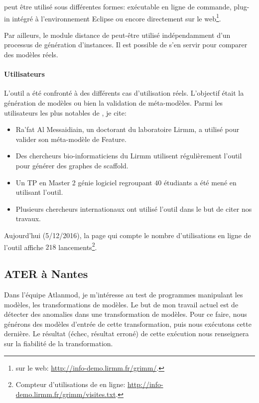 \grimm{} peut être utilisé sous différentes formes: exécutable en ligne de commande, plug-in intégré à l'environnement Eclipse ou encore directement sur le web\footnote{\grimm{} sur le web: \url{http://info-demo.lirmm.fr/grimm/}.}.

Par ailleurs, le module distance de \grimm{} peut-être utilisé indépendamment d'un processus de génération d'instances. Il est possible de s'en servir pour comparer des modèles réels. 

\paragraph*{Utilisateurs} L'outil \grimm{} a été confronté à des différents cas d'utilisation réels. L'objectif était la génération de modèles ou bien la validation de méta-modèles. Parmi les utilisateurs les plus notables de \grimm{}, je cite:

\begin{itemize}
\item Ra'fat Al Messaidiain, un doctorant du laboratoire Lirmm, a utilisé \grimm{} pour valider son méta-modèle de Feature.
\item Des chercheurs bio-informaticiens du Lirmm utilisent régulièrement l'outil pour générer des graphes de scaffold.
\item Un TP en Master 2 génie logiciel regroupant $40$ étudiants a été mené en utilisant l'outil.
\item Plusieurs chercheurs internationaux ont utilisé l'outil dans le but de citer nos travaux.
\end{itemize}

Aujourd'hui (5/12/2016), la page qui compte le nombre d'utilisations en ligne de l'outil affiche $218$ lancements\footnote{Compteur d'utilisations de \grimm{} en ligne: \url{http://info-demo.lirmm.fr/grimm/visites.txt}.}. 


\subsection{ATER à Nantes}

Dans l'équipe Atlanmod, je m'intéresse au test de programmes manipulant les modèles, les transformations de modèles. Le but de mon travail actuel est de détecter des anomalies dans une transformation de modèles. Pour ce faire, nous générons des modèles d'entrée de cette transformation, puis nous exécutons cette dernière. Le résultat (échec, résultat erroné) de cette exécution nous renseignera sur la fiabilité de la transformation.


